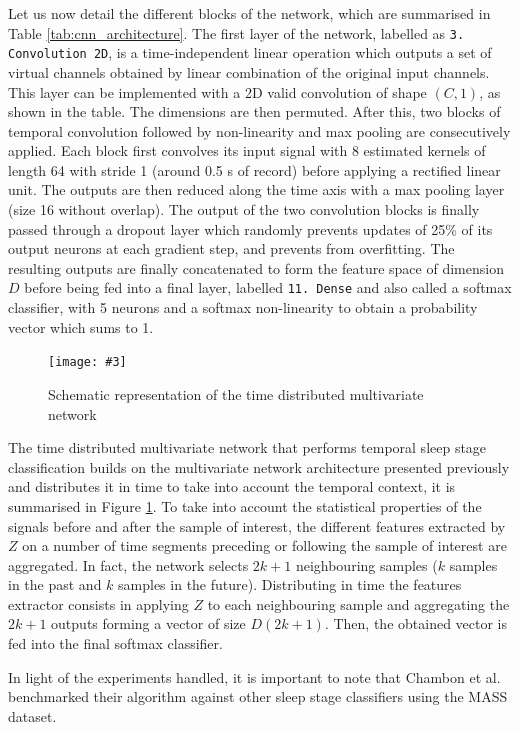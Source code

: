 \documentclass[titlepage, 11pt, a4paper, fancysections]{article}
\newcommand{\fig}[5]{\begin{figure}[#1] \centering \texttt{[image: \#3]} \caption{#4} \label{#5} \end{figure}}
\begin{document}
Let us now detail the different blocks of the network, which are summarised in Table \ref{tab:cnn_architecture}. The first layer of the network, labelled as \texttt{3. Convolution 2D}, is a time-independent linear operation which outputs a set of virtual channels obtained by linear combination of the original input channels. This layer can be implemented with a 2D valid convolution of shape $(C, 1)$, as shown in the table. The dimensions are then permuted. After this, two blocks of temporal convolution followed by non-linearity and max pooling are consecutively applied. Each block first convolves its input signal with 8 estimated kernels of length 64 with stride 1 (around 0.5 s of record) before applying a rectified linear unit. The outputs are then reduced along the time axis with a max pooling layer (size 16 without overlap). The output of the two convolution blocks is finally passed through a dropout layer which randomly prevents updates of 25\% of its output neurons at each gradient step, and prevents from overfitting. The resulting outputs are finally concatenated to form the feature space of dimension $D$ before being fed into a final layer, labelled \texttt{11. Dense} and also called a softmax classifier, with 5 neurons and a softmax non-linearity to obtain a probability vector which sums to 1. 

\fig{!ht}{0.7\linewidth}{model/temporal_scheme.png}{Schematic representation of the time distributed multivariate network}{fig:temporal_context}

The time distributed multivariate network that performs temporal sleep stage classification builds on the multivariate network architecture presented previously and distributes it in time to take into account the temporal context, it is summarised in Figure \ref{fig:temporal_context}. To take into account the statistical properties of the signals before and after the sample of interest, the different features extracted by $Z$ on a number of time segments preceding or following the sample of interest are aggregated. In fact, the network selects $2k+1$ neighbouring samples ($k$ samples in the past and $k$ samples in the future). Distributing in time the features extractor consists in applying $Z$ to each neighbouring sample and aggregating the $2k + 1$ outputs forming a vector of size $D(2k + 1)$. Then, the obtained vector is fed into the final softmax classifier. 

In light of the experiments handled, it is important to note that Chambon et al. benchmarked their algorithm against other sleep stage classifiers using the MASS dataset. 
\end{document}
